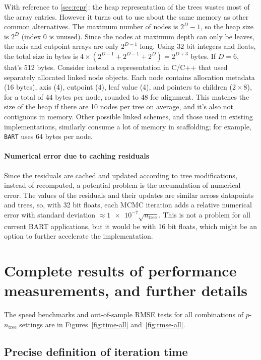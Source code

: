 \documentclass{article}
\begin{document}
    With reference to \autoref{sec:repr}: the heap representation of the trees wastes most of the array entries. However it turns out to use about the same memory as other common alternatives. The maximum number of nodes is $2^D - 1$, so the heap size is $2^D$ (index 0 is unused). Since the nodes at maximum depth can only be leaves, the axis and cutpoint arrays are only $2^{D-1}$ long. Using 32 bit integers and floats, the total size in bytes is $4 \times (2^{D-1} + 2^{D-1} + 2^{D}) = 2^{D+3}$ bytes. If $D=6$, that's 512 bytes. Consider instead a representation in C/C++ that used separately allocated linked node objects. Each node contains allocation metadata (16 bytes), axis (4), cutpoint (4), leaf value (4), and pointers to children ($2\times 8$), for a total of 44 bytes per node, rounded to 48 for alignment. This matches the size of the heap if there are 10 nodes per tree on average, and it's also not contiguous in memory. Other possible linked schemes, and those used in existing implementations, similarly consume a lot of memory in scaffolding; for example, \texttt{BART} uses 64 bytes per node. %

    \paragraph{Numerical error due to caching residuals}

    Since the residuals are cached and updated according to tree modifications, instead of recomputed, a potential problem is the accumulation of numerical error. The values of the residuals and their updates are similar across datapoints and trees, so, with 32 bit floats, each MCMC iteration adds a relative numerical error with standard deviation $\approx \num{1e-7} \sqrt {n_\text{tree}}$. This is not a problem for all current BART applications, but it would be with 16 bit floats, which might be an option to further accelerate the implementation.


    \section{Complete results of performance measurements, and further details}

    The speed benchmarks and out-of-sample RMSE tests for all combinations of $p$-$n_\text{tree}$ settings are in Figures~\ref{fig:time-all} and~\ref{fig:rmse-all}.

    \subsection{Precise definition of iteration time}
    \label{sec:itertime}
\end{document}
